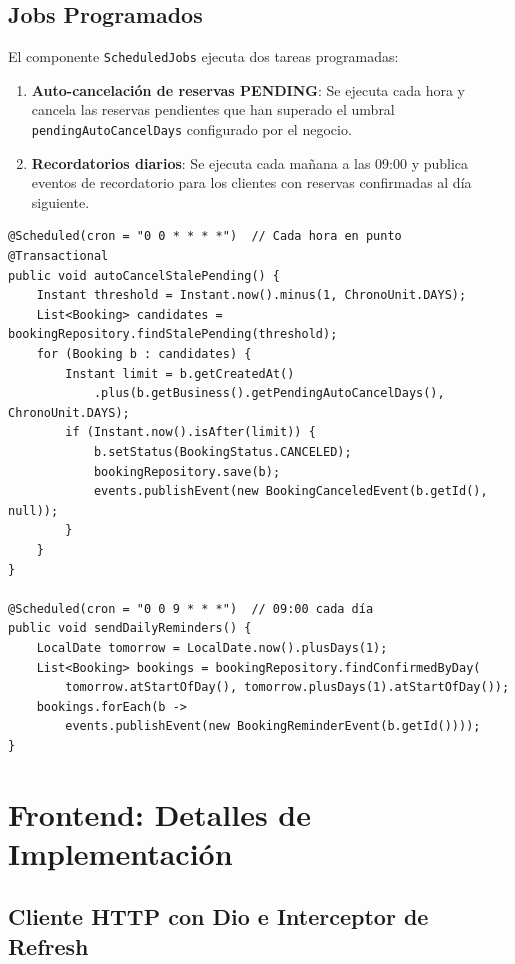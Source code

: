 \documentclass[12pt,a4paper,twoside]{report}
\begin{document}
\subsection{Jobs Programados}

El componente \texttt{ScheduledJobs} ejecuta dos tareas programadas:

\begin{enumerate}
  \item \textbf{Auto-cancelación de reservas PENDING}: Se ejecuta cada hora y cancela las reservas pendientes que han superado el umbral \texttt{pendingAutoCancelDays} configurado por el negocio.
  \item \textbf{Recordatorios diarios}: Se ejecuta cada mañana a las 09:00 y publica eventos de recordatorio para los clientes con reservas confirmadas al día siguiente.
\end{enumerate}

\begin{lstlisting}[style=javaStyle, caption={Job de auto-cancelación con @Scheduled}, label={lst:scheduler}]
@Scheduled(cron = "0 0 * * * *")  // Cada hora en punto
@Transactional
public void autoCancelStalePending() {
    Instant threshold = Instant.now().minus(1, ChronoUnit.DAYS);
    List<Booking> candidates = bookingRepository.findStalePending(threshold);
    for (Booking b : candidates) {
        Instant limit = b.getCreatedAt()
            .plus(b.getBusiness().getPendingAutoCancelDays(), ChronoUnit.DAYS);
        if (Instant.now().isAfter(limit)) {
            b.setStatus(BookingStatus.CANCELED);
            bookingRepository.save(b);
            events.publishEvent(new BookingCanceledEvent(b.getId(), null));
        }
    }
}

@Scheduled(cron = "0 0 9 * * *")  // 09:00 cada día
public void sendDailyReminders() {
    LocalDate tomorrow = LocalDate.now().plusDays(1);
    List<Booking> bookings = bookingRepository.findConfirmedByDay(
        tomorrow.atStartOfDay(), tomorrow.plusDays(1).atStartOfDay());
    bookings.forEach(b ->
        events.publishEvent(new BookingReminderEvent(b.getId())));
}
\end{lstlisting}

\section{Frontend: Detalles de Implementación}

\subsection{Cliente HTTP con Dio e Interceptor de Refresh}
\end{document}
